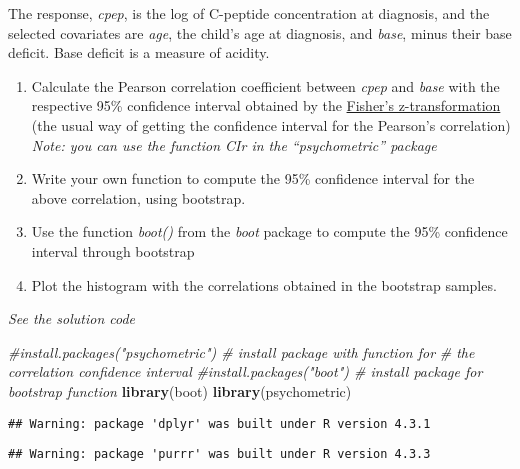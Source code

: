 \documentclass[
]{book}
\newenvironment{Shaded}{\begin{snugshade}}{\end{snugshade}}
\newcommand{\CommentTok}[1]{\textcolor[rgb]{0.56,0.35,0.01}{\textit{#1}}}
\newcommand{\FunctionTok}[1]{\textcolor[rgb]{0.13,0.29,0.53}{\textbf{#1}}}
\newcommand{\NormalTok}[1]{#1}
\begin{document}
The response, \emph{cpep}, is the log of C-peptide concentration at diagnosis, and
the selected covariates are \emph{age}, the child's age at diagnosis, and \emph{base},
minus their base deficit. Base deficit is a measure of acidity.

\begin{enumerate}
\def\labelenumi{\arabic{enumi})}
\item
  Calculate the Pearson correlation coefficient between \emph{cpep} and \emph{base} with
  the respective 95\% confidence interval obtained by the \href{https://en.wikipedia.org/wiki/Fisher_transformation}{Fisher's
  z-transformation} (the
  usual way of getting the confidence interval for the Pearson's correlation)\\
  \emph{Note: you can use the function CIr in the ``psychometric'' package}
\item
  Write your own function to compute the 95\% confidence interval
  for the above correlation, using bootstrap.
\item
  Use the function \emph{boot()} from the \emph{boot} package to compute
  the 95\% confidence interval through bootstrap
\item
  Plot the histogram with the correlations obtained in
  the bootstrap samples.
\end{enumerate}

\emph{See the solution code}

\begin{Shaded}
\begin{Highlighting}[]
\CommentTok{\#install.packages("psychometric") \# install package with function for}
                                 \CommentTok{\# the correlation confidence interval}
\CommentTok{\#install.packages("boot")         \# install package for bootstrap function}
\FunctionTok{library}\NormalTok{(boot)}
\FunctionTok{library}\NormalTok{(psychometric) }
\end{Highlighting}
\end{Shaded}

\begin{verbatim}
## Warning: package 'dplyr' was built under R version 4.3.1
\end{verbatim}

\begin{verbatim}
## Warning: package 'purrr' was built under R version 4.3.3
\end{verbatim}
\end{document}
